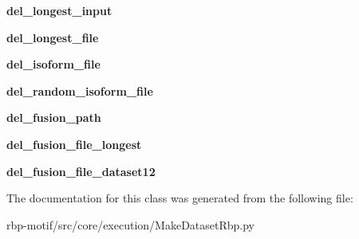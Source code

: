 \begin{DoxyCompactItemize}
\item 
\hypertarget{classsrc_1_1core_1_1execution_1_1MakeDatasetRbp_1_1MakeDatasetRbp_af2f813052f61b6fab9eba62cf2b8be35}{{\bfseries del\-\_\-longest\-\_\-input}}\label{classsrc_1_1core_1_1execution_1_1MakeDatasetRbp_1_1MakeDatasetRbp_af2f813052f61b6fab9eba62cf2b8be35}

\item 
\hypertarget{classsrc_1_1core_1_1execution_1_1MakeDatasetRbp_1_1MakeDatasetRbp_a6ffe1c78bcf4e091950887a99899a118}{{\bfseries del\-\_\-longest\-\_\-file}}\label{classsrc_1_1core_1_1execution_1_1MakeDatasetRbp_1_1MakeDatasetRbp_a6ffe1c78bcf4e091950887a99899a118}

\item 
\hypertarget{classsrc_1_1core_1_1execution_1_1MakeDatasetRbp_1_1MakeDatasetRbp_ab30e9f0c34901dbaf19a80744c33a4ed}{{\bfseries del\-\_\-isoform\-\_\-file}}\label{classsrc_1_1core_1_1execution_1_1MakeDatasetRbp_1_1MakeDatasetRbp_ab30e9f0c34901dbaf19a80744c33a4ed}

\item 
\hypertarget{classsrc_1_1core_1_1execution_1_1MakeDatasetRbp_1_1MakeDatasetRbp_a3fd8eb5d78c1b4391a44204cafa1af8c}{{\bfseries del\-\_\-random\-\_\-isoform\-\_\-file}}\label{classsrc_1_1core_1_1execution_1_1MakeDatasetRbp_1_1MakeDatasetRbp_a3fd8eb5d78c1b4391a44204cafa1af8c}

\item 
\hypertarget{classsrc_1_1core_1_1execution_1_1MakeDatasetRbp_1_1MakeDatasetRbp_a8081de774ec5b81c57a7553a08501e94}{{\bfseries del\-\_\-fusion\-\_\-path}}\label{classsrc_1_1core_1_1execution_1_1MakeDatasetRbp_1_1MakeDatasetRbp_a8081de774ec5b81c57a7553a08501e94}

\item 
\hypertarget{classsrc_1_1core_1_1execution_1_1MakeDatasetRbp_1_1MakeDatasetRbp_a3e7c2e937161000ed16e109fa75f5948}{{\bfseries del\-\_\-fusion\-\_\-file\-\_\-longest}}\label{classsrc_1_1core_1_1execution_1_1MakeDatasetRbp_1_1MakeDatasetRbp_a3e7c2e937161000ed16e109fa75f5948}

\item 
\hypertarget{classsrc_1_1core_1_1execution_1_1MakeDatasetRbp_1_1MakeDatasetRbp_a6623920d27f5bf02a65df2fcd348c5ab}{{\bfseries del\-\_\-fusion\-\_\-file\-\_\-dataset12}}\label{classsrc_1_1core_1_1execution_1_1MakeDatasetRbp_1_1MakeDatasetRbp_a6623920d27f5bf02a65df2fcd348c5ab}

\end{DoxyCompactItemize}


The documentation for this class was generated from the following file\-:\begin{DoxyCompactItemize}
\item 
rbp-\/motif/src/core/execution/Make\-Dataset\-Rbp.\-py\end{DoxyCompactItemize}
